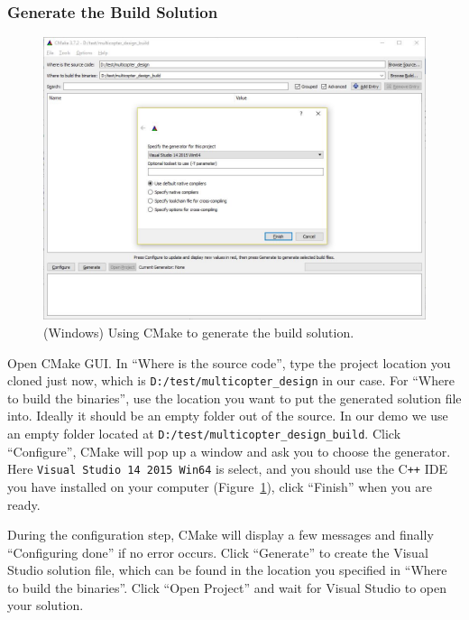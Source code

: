 \subsubsection{Generate the Build Solution}
\begin{figure}[!htb]
  \centering
  \includegraphics[width=0.75\linewidth]{windows_cmake_code_locations}
  \caption{(Windows) Using CMake to generate the build solution.}
  \label{fig:windows_cmake_code_locations}
\end{figure}
Open CMake GUI. In ``Where is the source code'', type the project location you cloned just now, which is \texttt{D:/test/multicopter\_design} in our case. For ``Where to build the binaries'', use the location you want to put the generated solution file into. Ideally it should be an empty folder out of the source. In our demo we use an empty folder located at \texttt{D:/test/multicopter\_design\_build}. Click ``Configure'', CMake will pop up a window and ask you to choose the generator. Here \texttt{Visual Studio 14 2015 Win64} is select, and you should use the C\texttt{++} IDE you have installed on your computer (Figure~\ref{fig:windows_cmake_code_locations}), click ``Finish'' when you are ready.

During the configuration step, CMake will display a few messages and finally ``Configuring done'' if no error occurs. Click ``Generate'' to create the Visual Studio solution file, which can be found in the location you specified in ``Where to build the binaries''. Click ``Open Project'' and wait for Visual Studio to open your solution.

